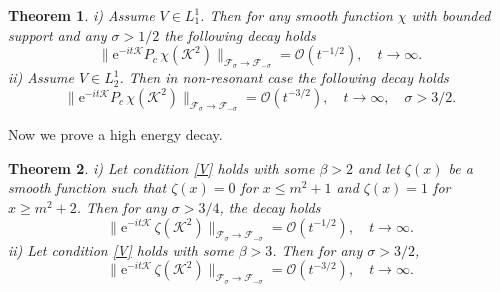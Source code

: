 \documentclass[reqno]{amsart}
\newtheorem{theorem}{Theorem}[section]
\newcommand{\cF}{{\mathcal F}}
\newcommand{\cK}{{\mathcal K}}
\newcommand{\E}{\mathrm{e}}
\numberwithin{equation}{section}
\begin{document}
\begin{theorem}\label{thKG2}  
i) Assume $V\in L^1_1$. Then for any smooth function $\chi$ with bounded support and any $\sigma>1/2$ the following decay holds
\[
\big\| \E^{-it\cK}P_c\,\chi(\cK^2)\big\|_{\cF_\sigma\to \cF_{-\sigma}}
={\mathcal O}(t^{-1/2}),\quad t\to \infty.
\]
ii)
Assume $V\in L^1_2$. Then in non-resonant case  the following decay holds
\[
\big\| \E^{-it\cK}P_c\,\chi(\cK^2)\big\|_{\cF_\sigma\to \cF_{-\sigma}}
={\mathcal O}(t^{-3/2}),\quad t\to \infty,\quad \sigma>3/2.
\]
\end{theorem}
Now we prove a high energy decay.  
\begin{theorem}\label{thKG3}
i) Let condition \eqref{V} holds with some $\beta>2$ and let  $\zeta(x)$ be a smooth function such that $\zeta(x)=0$ for $x\le m^2+1$ and
$\zeta(x)=1$ for $x\geq m^2 + 2$.
Then  for any $\sigma>3/4$, the decay holds  
\begin{equation}\label{b1}
\big\|\E^{-it\cK}\,\zeta(\cK^2)\big\|_{{\mathcal F}_\sigma\to {\mathcal F}_{-\sigma}}
={\mathcal O}(t^{-1/2}),\quad t\to \infty.
\end{equation}
ii)
Let condition \eqref{V} holds with some $\beta>3$.  Then for any $\sigma>3/2$,
\begin{equation}\label{b2}
\big\|\E^{-it\cK}\,\zeta(\cK^2)\big\|_{{\mathcal F}_\sigma\to {\mathcal F}_{-\sigma}}
={\mathcal O}(t^{-3/2}),\quad t\to \infty.
\end{equation}
\end{theorem}
\end{document}

